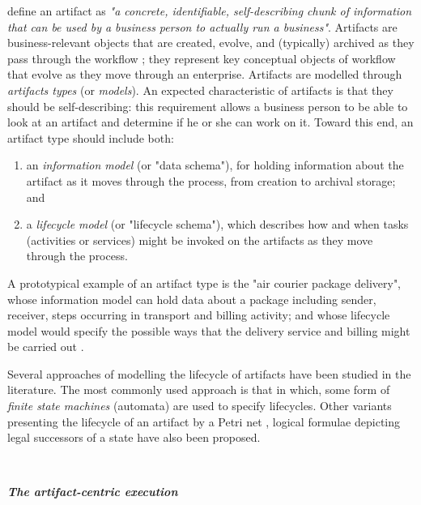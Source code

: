 \cite{nigam2003business} define an artifact as \textit{"a concrete, identifiable, self-describing chunk of information that can be used by a business person to actually run a business"}. Artifacts are business-relevant objects that are created, evolve, and (typically) archived as they pass through the workflow \cite{hull2009facilitating}; they represent key conceptual objects of workflow that evolve as they move through an enterprise. Artifacts are modelled through \textit{artifacts types} (or \textit{models}). An expected characteristic of artifacts is that they should be self-describing: this requirement allows a business person to be able to look at an artifact and determine if he or she can work on it. Toward this end, an artifact type should include both:
\begin{enumerate}
	\item an \textit{information model} (or "data schema"), for holding information about the artifact as it moves through the process, from creation to archival storage; and
	\item a \textit{lifecycle model} (or "lifecycle schema"), which describes how and when tasks (activities or services) might be invoked on the artifacts as they move through the process.
\end{enumerate}
A prototypical example of an artifact type is the "air courier package delivery", whose information model can hold data about a package including sender, receiver, steps occurring in transport and billing activity; and whose lifecycle model would specify the possible ways that the delivery service and billing might be carried out \cite{hull2013data, hull2009facilitating}.

Several approaches of modelling the lifecycle of artifacts have been studied in the literature. The most commonly used approach is that in which, some form of \textit{finite state machines} (automata) \cite{hull2009facilitating} are used to specify lifecycles. Other variants presenting the lifecycle of an artifact by a Petri net \cite{lohmann2010artifact}, logical formulae depicting legal successors of a state \cite{damaggio2012artifact} have also been proposed.


~

\noindent\textbf{\textit{The artifact-centric execution}}

